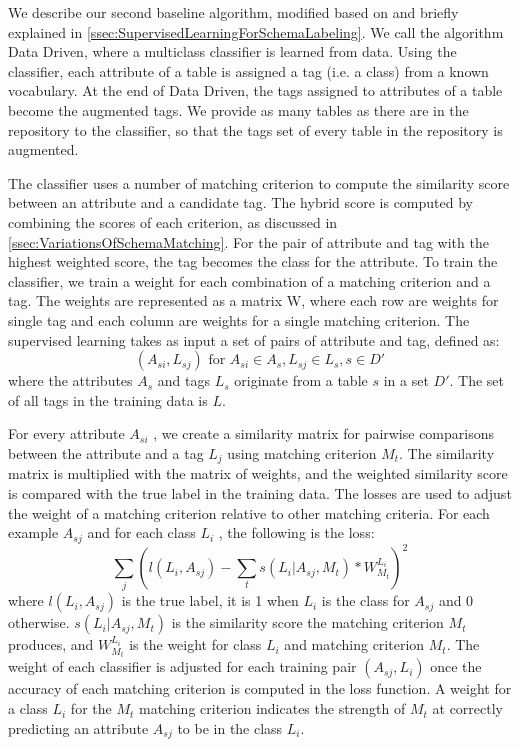 We describe our second baseline algorithm, modified based on \cite{10.1145/3184558.3191601} and briefly explained in \autoref{ssec:SupervisedLearningForSchemaLabeling}. We call the algorithm Data Driven, where a multiclass classifier is learned from data. Using the classifier, each attribute of a table is assigned a tag (i.e. a class) from a known vocabulary. At the end of Data Driven, the tags assigned to attributes of a table become the augmented tags. We provide as many tables as there are in the repository to the classifier, so that the tags set of every table in the repository is augmented.

The classifier uses a number of matching criterion to compute the similarity score between an attribute and a candidate tag. The hybrid score is computed by combining the scores of each criterion, as discussed in \autoref{ssec:VariationsOfSchemaMatching}. For the pair of attribute and tag with the highest weighted score, the tag becomes the class for the attribute. To train the classifier, we train a weight for each combination of a matching criterion and a tag. The weights are represented as a matrix W, where each row are weights for single tag and each column are weights for a single matching criterion. The supervised learning takes as input a set of pairs of attribute and tag, defined as:
\[
(A_{si},L_{sj})\text{ for }A_{si}\in A_{s},L_{sj}\in L_{s},s\in D'
\]
where the attributes $A_s$ and tags $L_s$ originate from a table $s$ in a set ${D'}$. The set of all tags in the training data is $L$.

For every attribute $A_{si}$ , we create a similarity matrix for pairwise comparisons between the attribute and a tag $L_j$ using matching criterion $M_t$. The similarity matrix is multiplied with the matrix of weights, and the weighted similarity score is compared with the true label in the training data. The losses are used to adjust the weight of a matching criterion relative to other matching criteria. For each example $A_{sj}$ and for each class $L_i$ , the following is the loss: 
\[
\sum_{j}(l(L_{i},A_{sj})-\sum_{t}s(L_{i}|A_{sj},M_{t})\ast W_{M_{t}}^{L_{i}})^{2}
\]
where $l(L_{i},A_{sj})$ is the true label, it is 1 when $L_{i}$ is the class for $A_{sj}$ and 0 otherwise. $s(L_{i}|A_{sj},M_{t})$ is the similarity score the matching criterion $M_{t}$ produces, and $W_{M_{t}}^{L_{i}}$ is the weight for class $L_{i}$ and matching criterion $M_{t}$. The weight of each classifier is adjusted for each training pair $(A_{sj}, L_{i})$ once the accuracy of each matching criterion is computed in the loss function. A weight for a class $L_{i}$ for the $M_{t}$ matching criterion indicates the strength of $M_{t}$ at correctly predicting an attribute $A_{sj}$ to be in the class $L_{i}$.

